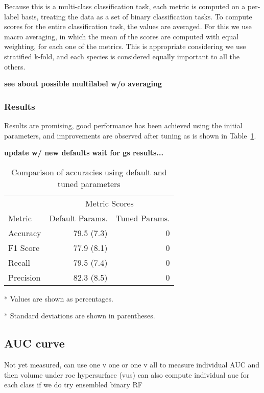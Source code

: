 Because this is a multi-class classification task, each metric is computed
on a per-label basis, treating the data as a set of binary classification tasks.
To compute scores for the entire classification task, the values are averaged.
For this we use macro averaging, in which the mean of the scores are computed with equal
weighting, for each one of the metrics.
This is appropriate considering we use stratified k-fold, and each
species is considered equally important to all the others.

\textbf{see about possible multilabel w/o averaging}

\subsubsection{Results}
Results are promising, good performance has been achieved using the initial
parameters, and improvements are observed after tuning as is shown in
Table~\ref{tbl:acc_before_after}.

\textbf{update w/ new defaults}
\textbf{wait for gs results... }
\begin{table}[!htb]
  \centering
  \caption{Comparison of accuracies using default and tuned parameters}
  \label{tbl:acc_before_after}
  \begin{threeparttable}
    \begin{tabular}{l r r}
      & \multicolumn{2}{c}{Metric Scores} \\
      Metric    & Default Params. & Tuned Params. \\ \hline
      Accuracy  & 79.5 (7.3) & 0 \\
      F1 Score  & 77.9 (8.1) & 0 \\
      Recall    & 79.5 (7.4) & 0 \\
      Precision & 82.3 (8.5) & 0
    \end{tabular}
    \begin{tablenotes}
      \footnotesize
      \item[*] Values are shown as percentages.
      \item[*] Standard deviations are shown in parentheses.
    \end{tablenotes}
  \end{threeparttable}
\end{table}

\subsection{AUC curve}
Not yet measured, can use one v one or one v all to measure individual AUC
and then volume under roc hypersurface (vus)
can also compute individual auc for each class if we do try ensembled binary RF

